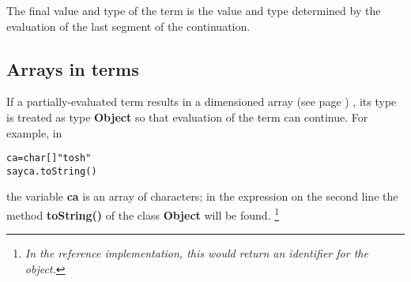 The final value and type of the term is the value and type determined by
the evaluation of the last segment of the continuation.
\subsection{Arrays in terms}\label{refsarrayp}
 
If a partially-evaluated term results in a dimensioned
 array (see page \pageref{refarray}) , its type is treated as type
\textbf{Object} so that evaluation of the term can continue.  For
example, in
\begin{alltt}
ca=char[] "tosh"
say ca.toString()
\end{alltt}
the variable \textbf{ca} is an array of characters; in the expression
on the second line the method \textbf{toString()} of the
class \textbf{Object} will be found.
\footnote{
\emph{In the reference implementation, this would return an identifier
for the object.}
}
